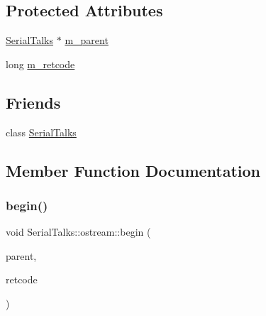 \subsection*{Protected Attributes}
\begin{DoxyCompactItemize}
\item 
\hyperlink{class_serial_talks}{Serial\+Talks} $\ast$ \hyperlink{class_serial_talks_1_1ostream_af35d44c5adbf25432861c38fbfe57e41}{m\+\_\+parent}
\item 
long \hyperlink{class_serial_talks_1_1ostream_a8e8b98c29014e66ad4d99597e7a4092b}{m\+\_\+retcode}
\end{DoxyCompactItemize}
\subsection*{Friends}
\begin{DoxyCompactItemize}
\item 
class \hyperlink{class_serial_talks_1_1ostream_a4cd752c675c62b44d1424308b66cf98c}{Serial\+Talks}
\end{DoxyCompactItemize}


\subsection{Member Function Documentation}
\mbox{\label{class_serial_talks_1_1ostream_a3755f0cb78f3d56b593d69b8a360057c}} 
\subsubsection{\texorpdfstring{begin()}{begin()}}
{\footnotesize\ttfamily void Serial\+Talks\+::ostream\+::begin (\begin{DoxyParamCaption}\item[{\hyperlink{class_serial_talks}{Serial\+Talks} \&}]{parent,  }\item[{long}]{retcode }\end{DoxyParamCaption})\hspace{0.3cm}{\ttfamily [protected]}}

\mbox{\label{class_serial_talks_1_1ostream_aa6dadfdfa9e38d5c13e55719f8cd7bfe}} 
